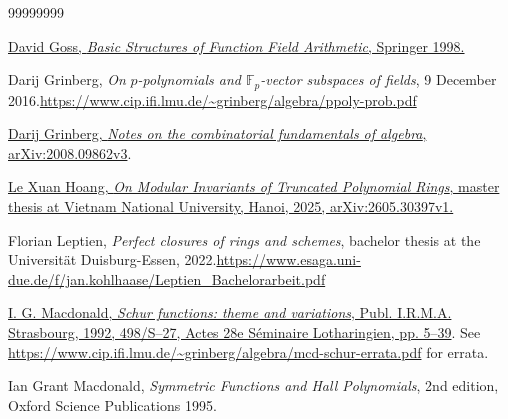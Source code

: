 \documentclass[numbers=enddot,12pt,final,onecolumn,notitlepage]{scrartcl}%
\numberwithin{exer}{section}
\theoremstyle{definition}
\theoremstyle{plainsl}
\begin{document}
\begin{thebibliography}{99999999}                                                                                         %


\href{https://doi.org/10.1007/978-3-642-61480-4}{David
Goss, \textit{Basic Structures of Function Field Arithmetic}, Springer 1998.}

Darij Grinberg, \textit{On }$p$\textit{-polynomials
and $\mathbb{F}_{p}$-vector subspaces of fields}, 9 December 2016.\newline\url{https://www.cip.ifi.lmu.de/~grinberg/algebra/ppoly-prob.pdf}

\href{https://arxiv.org/abs/2008.09862v3}{Darij
Grinberg, \textit{Notes on the combinatorial fundamentals of algebra},
arXiv:2008.09862v3}.

\href{https://arxiv.org/abs/2605.30397v1}{Le Xuan
Hoang, \textit{On Modular Invariants of Truncated Polynomial Rings}, master
thesis at Vietnam National University, Hanoi, 2025, arXiv:2605.30397v1.}

Florian Leptien, \textit{Perfect closures of rings
and schemes}, bachelor thesis at the Universit\"{a}t Duisburg-Essen,
2022.\newline\url{https://www.esaga.uni-due.de/f/jan.kohlhaase/Leptien_Bachelorarbeit.pdf}

%
\href{https://www.mat.univie.ac.at/~slc/opapers/s28macdonald.html}{I. G.
Macdonald, \textit{Schur functions: theme and variations}, Publ. I.R.M.A.
Strasbourg, 1992, 498/S--27, Actes 28e S\'{e}minaire Lotharingien, pp. 5--39}.
See \url{https://www.cip.ifi.lmu.de/~grinberg/algebra/mcd-schur-errata.pdf}
for errata.

Ian Grant Macdonald, \textit{Symmetric Functions
and Hall Polynomials}, 2nd edition, Oxford Science Publications 1995.
\end{thebibliography}
\end{document}
